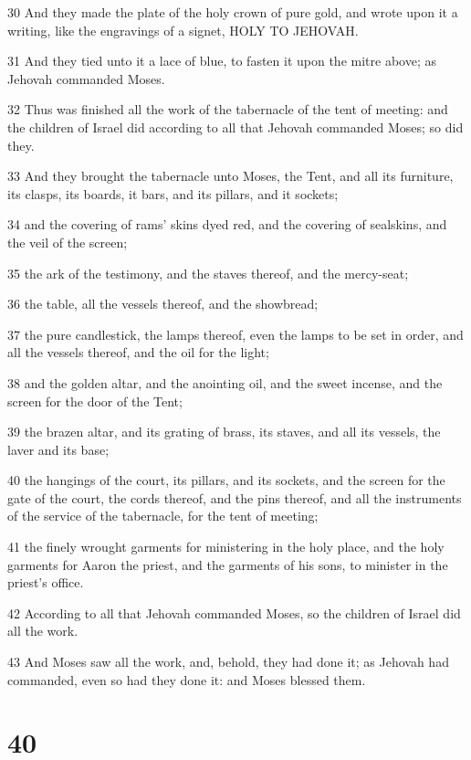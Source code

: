 \par 30 And they made the plate of the holy crown of pure gold, and wrote upon it a writing, like the engravings of a signet, HOLY TO JEHOVAH.
\par 31 And they tied unto it a lace of blue, to fasten it upon the mitre above; as Jehovah commanded Moses.
\par 32 Thus was finished all the work of the tabernacle of the tent of meeting: and the children of Israel did according to all that Jehovah commanded Moses; so did they.
\par 33 And they brought the tabernacle unto Moses, the Tent, and all its furniture, its clasps, its boards, it bars, and its pillars, and it sockets;
\par 34 and the covering of rams' skins dyed red, and the covering of sealskins, and the veil of the screen;
\par 35 the ark of the testimony, and the staves thereof, and the mercy-seat;
\par 36 the table, all the vessels thereof, and the showbread;
\par 37 the pure candlestick, the lamps thereof, even the lamps to be set in order, and all the vessels thereof, and the oil for the light;
\par 38 and the golden altar, and the anointing oil, and the sweet incense, and the screen for the door of the Tent;
\par 39 the brazen altar, and its grating of brass, its staves, and all its vessels, the laver and its base;
\par 40 the hangings of the court, its pillars, and its sockets, and the screen for the gate of the court, the cords thereof, and the pins thereof, and all the instruments of the service of the tabernacle, for the tent of meeting;
\par 41 the finely wrought garments for ministering in the holy place, and the holy garments for Aaron the priest, and the garments of his sons, to minister in the priest's office.
\par 42 According to all that Jehovah commanded Moses, so the children of Israel did all the work.
\par 43 And Moses saw all the work, and, behold, they had done it; as Jehovah had commanded, even so had they done it: and Moses blessed them.

\chapter{40}


